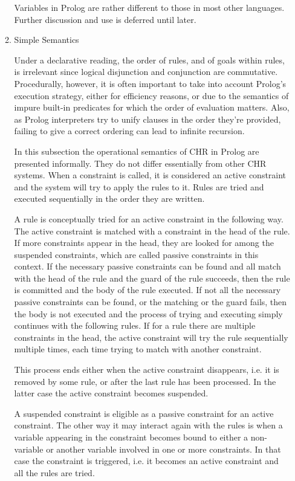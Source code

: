 \documentclass[thesis-solanki.tex]{subfiles}
\begin{document}
\begin{enumerate}
\begin{enumerate}
Variables in Prolog are rather different to those in most other languages. Further discussion and use is deferred until later.




\item Simple Semantics

Under a declarative reading, the order of rules, and of goals within rules, is irrelevant since logical disjunction and conjunction are 
commutative. Procedurally, however, it is often important to take into account Prolog's
 execution strategy, either for efficiency reasons, 
or due to the semantics of impure built-in predicates for which the order of evaluation matters. Also, as Prolog
 interpreters try to unify 
clauses in the order they're provided, failing to give a correct ordering can lead to infinite recursion.


In this subsection the operational semantics of CHR in Prolog are presented informally. They do not differ essentially from other CHR systems.
When a constraint is called, it is considered an active constraint and the system will try to apply the rules to it. Rules are tried and executed sequentially in the order they are written.

\cite{website:swiprologsyntaxandsemantics}

A rule is conceptually tried for an active constraint in the following way. The active constraint is matched with a constraint in the head of the rule. If more constraints appear in the head, they are looked for among the suspended constraints, which are called passive constraints in this context. If the necessary passive constraints can be found and all match with the head of the rule and the guard of the rule succeeds, then the rule is committed and the body of the rule executed. If not all the necessary passive constraints can be found, or the matching or the guard fails, then the body is not executed and the process of trying and executing simply continues with the following rules. If for a rule there are multiple constraints in the head, the active constraint will try the rule sequentially multiple times, each time trying to match with another constraint.

This process ends either when the active constraint disappears, i.e. it is removed by some rule, or after the last rule has been processed. In the latter case the active constraint becomes suspended.

A suspended constraint is eligible as a passive constraint for an active constraint. The other way it may interact again with the rules is when a variable appearing in the constraint becomes bound to either a non-variable or another variable involved in one or more constraints. In that case the constraint is triggered, i.e. it becomes an active constraint and all the rules are tried.
\begin{enumerate}


\end{enumerate}
\end{enumerate}
\end{enumerate}
\end{document}

